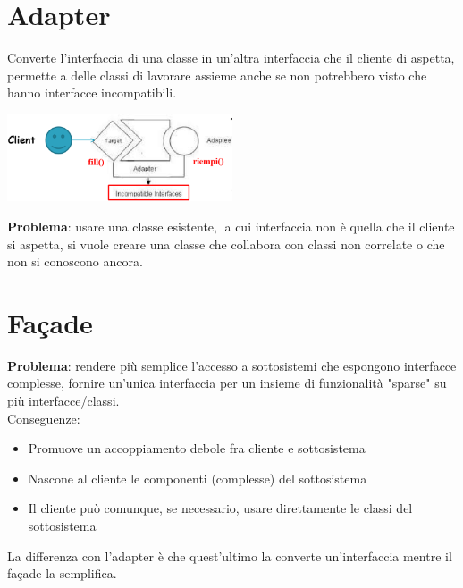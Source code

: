\documentclass[12pt, a4paper]{report}
\begin{document}
\section{Adapter}
Converte l'interfaccia di una classe in un'altra interfaccia che il cliente di aspetta, permette a delle classi di lavorare assieme anche se non potrebbero visto che hanno interfacce incompatibili.
\begin{center}
    \includegraphics[width=0.5\textwidth]{Immagini/adapter.png}
\end{center}
\textbf{Problema}: usare una classe esistente, la cui interfaccia non è quella che il cliente si aspetta, si vuole creare una classe che collabora con classi non correlate o che non si conoscono ancora.
\section{Façade}
\textbf{Problema}: rendere più semplice l'accesso a sottosistemi che espongono interfacce complesse, fornire un'unica interfaccia per un insieme di funzionalità "sparse" su più interfacce/classi.\\
Conseguenze:
\begin{itemize}
    \item Promuove un accoppiamento debole fra cliente e sottosistema
    \item Nascone al cliente le componenti (complesse) del sottosistema
    \item Il cliente può comunque, se necessario, usare direttamente le classi del sottosistema
\end{itemize}
La differenza con l'adapter è che quest'ultimo la converte un'interfaccia mentre il façade la semplifica.
\end{document}
